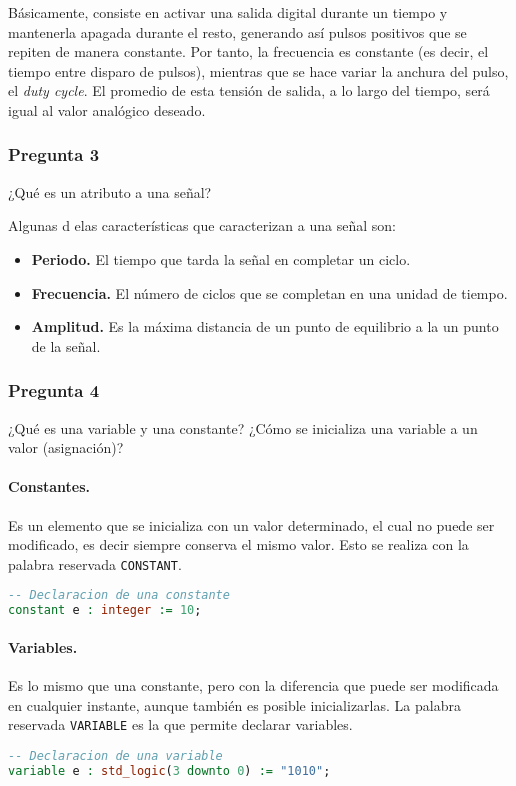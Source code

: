 \documentclass[../procedimientos.tex]{subfiles}
\begin{document}
Básicamente, consiste en activar una salida digital durante un tiempo y 
mantenerla apagada durante el resto, generando así pulsos positivos que se 
repiten de manera constante. Por tanto, la frecuencia es constante (es decir, 
el tiempo entre disparo de pulsos), mientras que se hace variar la anchura del 
pulso, el \textit{duty cycle}. El promedio de esta tensión de salida, a lo 
largo del tiempo, será igual al valor analógico deseado.

\subsubsection*{Pregunta 3}
\begin{em}
  ¿Qué es un atributo a una señal?
\end{em}

Algunas d elas características que caracterizan a una señal son:
\begin{itemize}
  \item \textbf{Periodo.} El tiempo que tarda la señal en completar un ciclo.
  \item \textbf{Frecuencia.} El número de ciclos que se completan en una 
    unidad de tiempo.
  \item \textbf{Amplitud.} Es la máxima distancia de un punto de equilibrio a 
    la un punto de la señal.
\end{itemize}

\subsubsection*{Pregunta 4}
\begin{em}
  ¿Qué es una variable y una constante? ¿Cómo se inicializa una variable a un 
  valor (asignación)?
\end{em}

\paragraph{Constantes.} Es un elemento que se inicializa con un valor 
determinado, el cual no puede ser modificado, es decir siempre conserva el 
mismo valor. Esto se realiza con la palabra reservada \texttt{CONSTANT}.
\begin{lstlisting}[language=vhdl]
-- Declaracion de una constante
constant e : integer := 10;
\end{lstlisting}

\paragraph{Variables.} Es lo mismo que una constante, pero con la diferencia 
que puede ser modificada en cualquier instante, aunque también es posible 
inicializarlas. La palabra reservada \texttt{VARIABLE} es la que permite 
declarar variables.
\begin{lstlisting}[language=vhdl]
-- Declaracion de una variable
variable e : std_logic(3 downto 0) := "1010";
\end{lstlisting}
\end{document}
